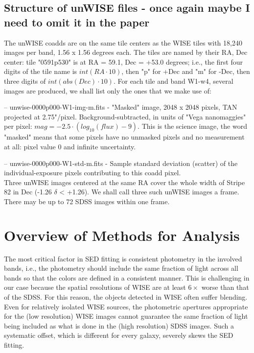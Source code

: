 \documentclass[apj,iop]{emulateapj}
\begin{document}
\subsection{Structure of unWISE files - once again maybe I need to omit it in the paper}

The unWISE coadds are on the same tile centers as the WISE tiles with 18,240 images per band, 1.56 x 1.56 degrees each. The tiles are named by their RA, Dec center: tile "0591p530" is at RA = 59.1, Dec = +53.0 degrees; i.e., the first four digits of the tile name is $int(RA \cdot 10)$, then "p" for +Dec and "m" for -Dec, then three digits of $int(abs(Dec)\cdot 10)$. For each tile and band W1-w4, several images are produced, we shall list only the ones that we make use of:

-- unwise-0000p000-W1-img-m.fits - "Masked" image, 2048 x 2048 pixels, TAN projected at 2.75"/pixel. Background-subtracted, in units of "Vega nanomaggies" per pixel: $mag = -2.5 \cdot (log_{10}(flux) - 9)$. This is the science image, the word "masked" means that some pixels have no unmasked pixels and no measurement at all: pixel value 0 and infinite uncertainty.

-- unwise-0000p000-W1-std-m.fits - Sample standard deviation (scatter) of the individual-exposure pixels  contributing to this coadd pixel.\\

Three unWISE images centered at the same RA cover the whole width of Stripe 82 in Dec (-1.26 $\delta$ < +1.26). We shall call three such unWISE images a frame. There may be up to 72 SDSS images within one frame.

\section{Overview of Methods for Analysis}

The most critical factor in SED fitting is consistent photometry in the involved bands, i.e., the photometry should include the same fraction of light across all bands so that the colors are defined in a consistent manner. This is challenging in our case because the spatial resolutions of WISE are at least $6\times$ worse than that of the SDSS. For this reason, the objects detected in WISE often suffer blending. Even for relatively isolated WISE sources, the photometric apertures appropriate for the (low resolution) WISE images cannot guarantee the same fraction of light being included as what is done in the (high resolution) SDSS images. Such a systematic offset, which is different for every galaxy, severely skews the SED fitting. 
\end{document}
